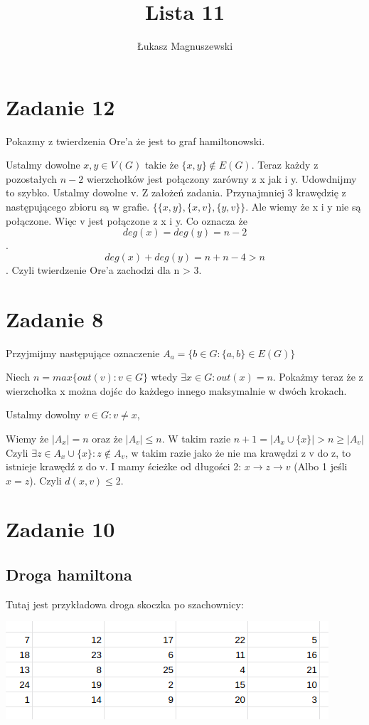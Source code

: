 \documentclass{article}
\title{Lista 11}
\author{Łukasz Magnuszewski}
\date{\vspace{-5ex}}
\begin{document}
\maketitle



\section*{Zadanie 12}
Pokazmy z twierdzenia Ore'a że jest to graf hamiltonowski.

Ustalmy dowolne $x, y \in V(G)$ takie że $\{x, y\} \not\in E(G)$. Teraz każdy z pozostałych $n-2$ wierzchołków jest połączony zarówny z x jak i y. Udowdnijmy to szybko. Ustalmy dowolne v. Z założeń zadania. Przynajmniej 3 krawędzię z następującego zbioru są w grafie. $\{ \{x,y\}, \{x,v\}, \{y,v\} \}$. Ale wiemy że x i y nie są połączone. Więc v jest połączone z x i y. Co oznacza że \[deg(x) = deg(y) = n - 2 \]. 
\[deg(x) + deg(y) = n + n - 4 > n\]. Czyli twierdzenie Ore'a zachodzi dla n > 3.


\section*{Zadanie 8}
Przyjmijmy następujące oznaczenie $A_a = \{ b \in G : \{a, b\} \in E(G) \}$

Niech $n = max \{out(v) : v \in G \}$ wtedy $\exists x \in G : out(x) = n$. Pokażmy teraz że z wierzchołka x można dojśc do każdego innego maksymalnie w dwóch krokach.

Ustalmy dowolny $v \in G : v \neq x$, 

Wiemy że $|A_x| = n$ oraz że $|A_v| \leq n$. W takim razie $n+1 = |A_x \cup \{x\}| > n \geq |A_v|$ Czyli $\exists z \in A_x \cup \{x\} : z \not\in A_v$, w takim razie jako że nie ma krawędzi z v do z, to istnieje krawędź z do v. I mamy ścieżke od długości 2:  $x \to z \to v$ (Albo 1 jeśli $x = z$). Czyli $d(x,v) \leq 2$.


\section*{Zadanie 10}

\subsection*{Droga hamiltona}
Tutaj jest przykładowa droga skoczka po szachownicy:


\includegraphics{skoczek}
\end{document}
